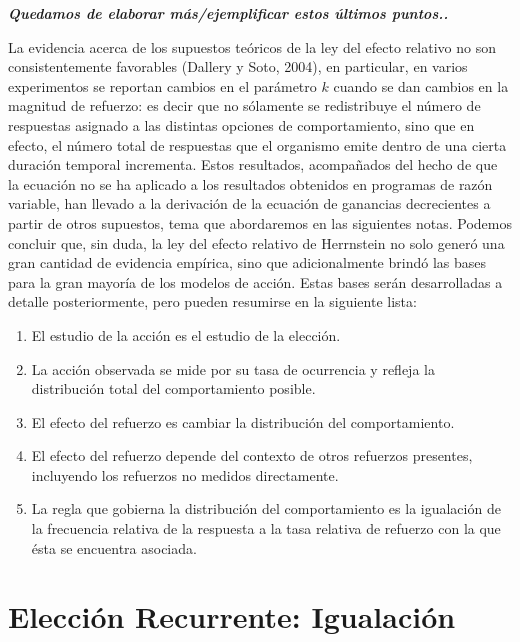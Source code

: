 \documentclass[
  letterpaper,
]{book}
\begin{document}
\textbf{\emph{Quedamos de elaborar más/ejemplificar estos últimos
puntos.. }}

La evidencia acerca de los supuestos teóricos de la ley del efecto
relativo no son consistentemente favorables (Dallery y Soto, 2004), en
particular, en varios experimentos se reportan cambios en el parámetro
\(k\) cuando se dan cambios en la magnitud de refuerzo: es decir que no
sólamente se redistribuye el número de respuestas asignado a las
distintas opciones de comportamiento, sino que en efecto, el número
total de respuestas que el organismo emite dentro de una cierta duración
temporal incrementa. Estos resultados, acompañados del hecho de que la
ecuación no se ha aplicado a los resultados obtenidos en programas de
razón variable, han llevado a la derivación de la ecuación de ganancias
decrecientes a partir de otros supuestos, tema que abordaremos en las
siguientes notas. Podemos concluir que, sin duda, la ley del efecto
relativo de Herrnstein no solo generó una gran cantidad de evidencia
empírica, sino que adicionalmente brindó las bases para la gran mayoría
de los modelos de acción. Estas bases serán desarrolladas a detalle
posteriormente, pero pueden resumirse en la siguiente lista:

\begin{enumerate}
\def\labelenumi{\arabic{enumi}.}
\item
  El estudio de la acción es el estudio de la elección.
\item
  La acción observada se mide por su tasa de ocurrencia y refleja la
  distribución total del comportamiento posible.
\item
  El efecto del refuerzo es cambiar la distribución del comportamiento.
\item
  El efecto del refuerzo depende del contexto de otros refuerzos
  presentes, incluyendo los refuerzos no medidos directamente.
\item
  La regla que gobierna la distribución del comportamiento es la
  igualación de la frecuencia relativa de la respuesta a la tasa
  relativa de refuerzo con la que ésta se encuentra asociada.
\end{enumerate}


\chapter{Elección Recurrente:
Igualación}\label{elecciuxf3n-recurrente-igualaciuxf3n}
\end{document}
